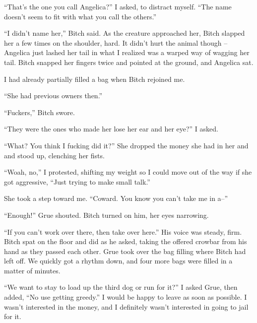 ``That's the one you call Angelica?'' I asked, to distract myself. ``The name doesn't seem to fit with what you call the others.''



``I didn't name her,'' Bitch said. As the creature approached her, Bitch slapped her a few times on the shoulder, hard. It didn't hurt the animal though – Angelica just lashed her tail in what I realized was a warped way of wagging her tail. Bitch snapped her fingers twice and pointed at the ground, and Angelica sat.



I had already partially filled a bag when Bitch rejoined me.



``She had previous owners then.''



``Fuckers,'' Bitch swore.



``They were the ones who made her lose her ear and her eye?'' I asked.



``What? You think I fucking did it?''  She dropped the money she had in her and and stood up, clenching her fists.



``Woah, no,'' I protested, shifting my weight so I could move out of the way if she got aggressive, ``Just trying to make small talk.''



She took a step toward me.  ``Coward.  You know you can't take me in a--''



``Enough!'' Grue shouted.  Bitch turned on him, her eyes narrowing.



``If you can't work over there, then take over here.''  His voice was steady, firm.  Bitch spat on the floor and did as he asked, taking the offered crowbar from his hand as they passed each other.  Grue took over the bag filling where Bitch had left off.  We quickly got a rhythm down, and four more bags were filled in a matter of minutes.



``We want to stay to load up the third dog or run for it?'' I asked Grue, then added, ``No use getting greedy.'' I would be happy to leave as soon as possible. I wasn't interested in the money, and I definitely wasn't interested in going to jail for it.



